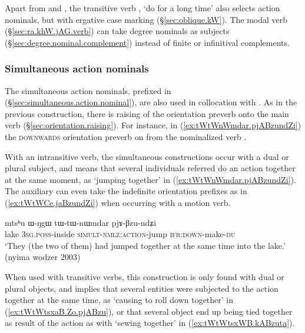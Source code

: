 Apart from  and , the transitive verb , `do for a long time' also selects action nominals, but with ergative case marking (§\ref{sec:oblique.kW}). The modal verb  (§\ref{sec:ra.khW.jAG.verb}) can take degree nominals as subjects (§\ref{sec:degree.nominal.complement}) instead of finite or infinitival complements.


\subsubsection{Simultaneous action nominals} \label{sec:simult.action.nominal.Bzu}
The simultaneous action nominals, prefixed in  (§\ref{sec:simultaneous.action.nominal}), are also used in collocation with .   As in the previous construction, there is raising of the orientation preverb onto the main verb  (§\ref{sec:orientation.raising}). For instance,  in (\ref{ex:tWtWnWmdar.pjABzundZi}) the \textsc{downwards} orientation preverb  on  from the nominalized verb . 

With an intransitive verb, the simultaneous constructions occur with a dual or plural subject, and means that several individuals referred do an action together at the same moment, as  `jumping together' in (\ref{ex:tWtWnWmdar.pjABzundZi}). The auxiliary  can even take the indefinite orientation prefixes   as in (\ref{ex:tWtWCe.jaBzundZi}) when occurring with a motion verb.

\begin{exe}
	\ex \label{ex:tWtWnWmdar.pjABzundZi}
	\gll  mtsʰu ɯ-ŋgɯ tɯ-tɯ-nɯmdar pjɤ-βzu-ndʑi  \\
	lake \textsc{3sg}.\textsc{poss}-inside \textsc{simult}-\textsc{nmlz}:\textsc{action}-jump \textsc{ifr}:\textsc{down}-make-\textsc{du}  \\
	\glt `They (the two of them) had jumped together at the same time into the lake.' (nyima wodzer 2003)
\end{exe}

When used with transitive verbs, this construction is only found with dual or plural objects, and implies that several entities were subjected to the action together at the same time, as  `causing to roll down together' in (\ref{ex:tWtWtsxaB.Zo.pjABzu}), or that several object end up being tied together as result of the action as with  `sewing together' in (\ref{ex:tWtWtsxWB.kABzuta}). 


